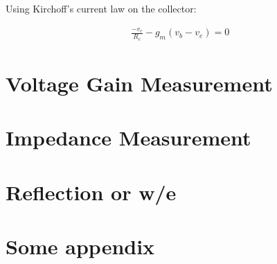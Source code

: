 \documentclass[a4paper,11pt]{article}
\begin{document}
Using Kirchoff's current law on the collector:

\begin{gather*}
\frac{-v_c}{R_c} - g_m(v_b - v_e) = 0
\end{gather*}


\section{Voltage Gain Measurement}

\section{Impedance Measurement}

\section{Reflection or w/e}

\begin{appendices}
    \label{appendix}
    \section{Some appendix}
    \label{app:one}
\end{appendices}



\end{document}
